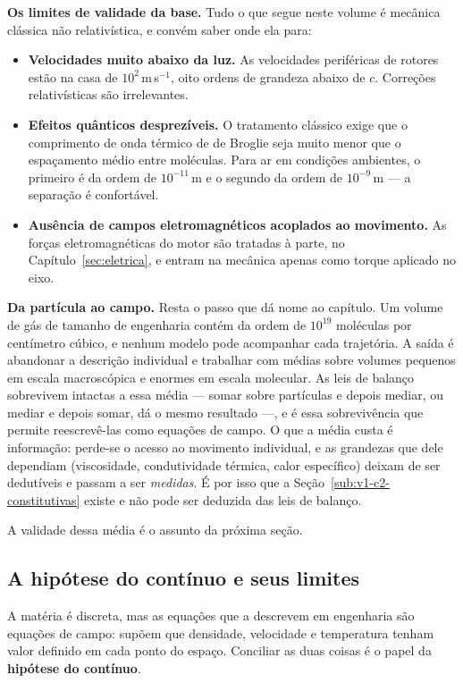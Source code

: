 \documentclass[12pt,a4paper]{article}
\numberwithin{equation}{section}
\numberwithin{table}{section}
\numberwithin{figure}{section}
\begin{document}
\textbf{Os limites de validade da base.} Tudo o que segue neste volume é
mecânica clássica não relativística, e convém saber onde ela para:

\begin{itemize}
	\item \textbf{Velocidades muito abaixo da luz.} As velocidades periféricas
	de rotores estão na casa de $10^2\,$m\,s$^{-1}$, oito ordens de grandeza
	abaixo de $c$. Correções relativísticas são irrelevantes.
	\item \textbf{Efeitos quânticos desprezíveis.} O tratamento clássico exige
	que o comprimento de onda térmico de de Broglie seja muito menor que o
	espaçamento médio entre moléculas. Para ar em condições ambientes, o
	primeiro é da ordem de $10^{-11}\,$m e o segundo da ordem de
	$10^{-9}\,$m --- a separação é confortável.
	\item \textbf{Ausência de campos eletromagnéticos acoplados ao movimento.}
	As forças eletromagnéticas do motor são tratadas à parte, no
	Capítulo~\ref{sec:eletrica}, e entram na mecânica apenas como torque
	aplicado no eixo.
\end{itemize}

\textbf{Da partícula ao campo.} Resta o passo que dá nome ao capítulo. Um
volume de gás de tamanho de engenharia contém da ordem de $10^{19}$ moléculas
por centímetro cúbico, e nenhum modelo pode acompanhar cada trajetória. A saída
é abandonar a descrição individual e trabalhar com médias sobre volumes
pequenos em escala macroscópica e enormes em escala molecular. As leis de
balanço sobrevivem intactas a essa média --- somar sobre partículas e depois
mediar, ou mediar e depois somar, dá o mesmo resultado ---, e é essa
sobrevivência que permite reescrevê-las como equações de campo. O que a média
custa é informação: perde-se o acesso ao movimento individual, e as grandezas
que dele dependiam (viscosidade, condutividade térmica, calor específico)
deixam de ser dedutíveis e passam a ser \emph{medidas}. É por isso que a
Seção~\ref{sub:v1-c2-constitutivas} existe e não pode ser deduzida das leis de
balanço.

A validade dessa média é o assunto da próxima seção.

\subsection{A hipótese do contínuo e seus limites}\label{sub:v1-c2-hipotese}

A matéria é discreta, mas as equações que a descrevem em engenharia são
equações de campo: supõem que densidade, velocidade e temperatura tenham valor
definido em cada ponto do espaço. Conciliar as duas coisas é o papel da
\textbf{hipótese do contínuo}.
\end{document}
